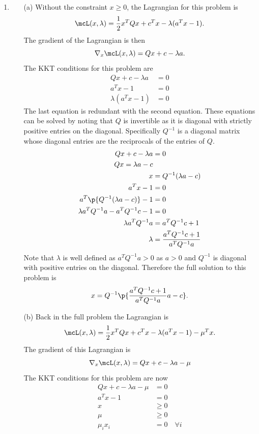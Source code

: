 \documentclass[11pt, oneside]{article}
\begin{document}
\begin{enumerate}
  \item %
    \begin{enumerate}
      \item[(a)] %
        Without the constraint $x \ge 0$, the Lagrangian for this problem
        is
        \[
          \mcL(x, \lambda) = \frac{1}{2} x^T Q x + c^T x - \lambda (a^T x - 1).
        \]
        The gradient of the Lagrangian is then
        \[
          \nabla_x \mcL(x, \lambda) = Q x + c - \lambda a.
        \]
        The KKT conditions for this problem are
        \begin{align*}
          Qx + c - \lambda a &= 0 \\
          a^T x - 1 &= 0 \\
          \lambda(a^T x - 1) &= 0
        \end{align*}
        The last equation is redundant with the second equation.
        These equations can be solved by noting that $Q$ is invertible as it is
        diagonal with strictly positive entries on the diagonal.
        Specifically $Q^{-1}$ is a diagonal matrix whose diagonal entries are
        the reciprocals of the entries of $Q$.
        \begin{align*}
          Qx + c - \lambda a &= 0 \\
          Qx = \lambda a - c \\
          x &= Q^{-1}(\lambda a - c) \\
          a^T x - 1 &= 0 \\
          a^T \p{Q^{-1}(\lambda a - c)} - 1 &= 0 \\
          \lambda a^T Q^{-1} a - a^T Q^{-1} c - 1 &= 0 \\
          \lambda a^T Q^{-1} a &= a^T Q^{-1} c + 1\\
          \lambda &= \frac{a^T Q^{-1} c + 1}{a^T Q^{-1} a}
        \end{align*}
        Note that $\lambda$ is well defined as $a^T Q^{-1} a > 0$ as $a > 0$ and
        $Q^{-1}$ is diagonal with positive entries on the diagonal.
        Therefore the full solution to this problem is
        \[
          x = Q^{-1} \p{\frac{a^T Q^{-1} c + 1}{a^T Q^{-1} a} a - c}.
        \]

      \item[(b)] %
        Back in the full problem the Lagrangian is
        \[
          \mcL(x, \lambda) = \frac{1}{2} x^T Q x + c^T x - \lambda (a^T x - 1) - \mu^T x.
        \]
        The gradient of this Lagrangian is
        \[
          \nabla_x \mcL(x, \lambda) = Q x + c - \lambda a - \mu
        \]
        The KKT conditions for this problem are now
        \begin{align*}
          Q x + c - \lambda a - \mu &= 0 \\
          a^T x - 1 &= 0 \\
          x &\ge 0 \\
          \mu &\ge 0 \\
          \mu_i x_i &= 0 \quad \forall i
        \end{align*}


\end{enumerate}
\end{enumerate}
\end{document}
